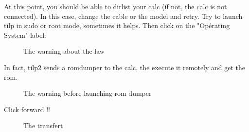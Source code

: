 \documentclass[10pt]{report}
\begin{document}
At this point, you should be able to dirlist your calc (if not, the calc is not connected).\newline
In this case, change the cable or the model and retry.\newline
Try to launch tilp in sudo or root mode, sometimes it helps.\newline\newline
Then click on the "Opérating System" label:\newline 
\begin{figure}[H]
\centering
{}
\caption{The warning about the law}
\end{figure}

In fact, tilp2 sends a romdumper to the calc, the execute it remotely and get the rom.\newline

\begin{figure}[H]
\centering
{}
\caption{The warning before launching rom dumper}
\end{figure}
Click forward !!\newline

\begin{figure}[H]
\centering
{}
\caption{The transfert}
\end{figure}
\end{document}
